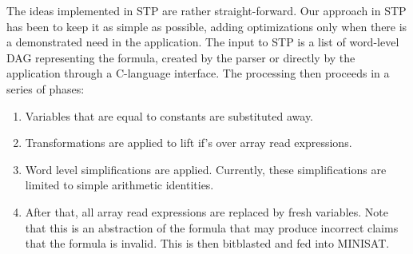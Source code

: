 \documentclass{article}
\begin{document}
The ideas implemented in STP are rather straight-forward. Our approach
in STP has been to keep it as simple as possible, adding optimizations
only when there is a demonstrated need in the application. The input
to STP is a list of word-level DAG representing the formula, created
by the parser or directly by the application through a C-language
interface. The processing then proceeds in a series of phases:

\begin{enumerate}


\item Variables that are equal to constants are substituted away.

\item Transformations are applied to lift if's over array read
expressions.






\item Word level simplifications are applied.  Currently, these
simplifications are limited to simple arithmetic identities.

\item After that, all array read expressions are replaced by fresh
variables.  Note that this is an abstraction of the formula that may
produce incorrect claims that the formula is invalid. This is then
bitblasted and fed into MINISAT.




\end{enumerate}
\end{document}
